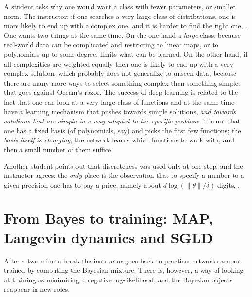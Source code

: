 \begin{discussion}
A student asks why one would want a class with fewer parameters, or smaller norm. The instructor: if one searches a very large class of distributions, one is more likely to end up with a complex one, and it is harder to find the right one, . One wants two things at the same time. On the one hand a \emph{large} class, because real-world data can be complicated and restricting to linear maps, or to polynomials up to some degree, limits what can be learned. On the other hand, if all complexities are weighted equally then one is likely to end up with a very complex solution, which probably does not generalize to unseen data, because there are many more ways to select something complex than something simple: that goes against Occam's razor. The success of deep learning is related to the fact that one can look at a very large class of functions and at the same time have a learning mechanism that pushes towards simple solutions, \emph{and towards solutions that are simple in a way adapted to the specific problem}: it is not that one has a fixed basis (of polynomials, say) and picks the first few functions; the \emph{basis itself is changing}, the network learns which functions to work with, and then a small number of them suffice.

Another student points out that discreteness was used only at one step, and the instructor agrees: the \emph{only} place is the observation that to specify a number to a given precision one has to pay a price, namely about $d\log(\|\theta\|/\delta)$ digits, .
\end{discussion}

\section{From Bayes to training: MAP, Langevin dynamics and SGLD}\label{sec:L5-training}
After a two-minute break the instructor goes back to practice: networks are not trained by computing the Bayesian mixture. There is, however, a way of looking at training as minimizing a negative log-likelihood, and the Bayesian objects reappear in new roles.

